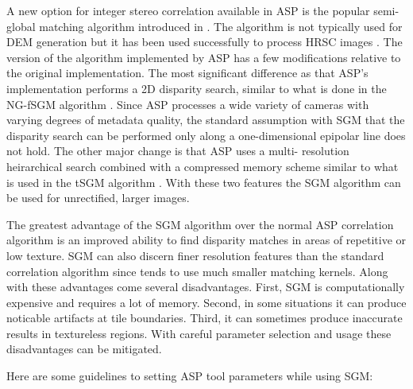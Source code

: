 A new option for integer stereo correlation available in ASP is the 
popular semi-global matching algorithm introduced in 
\citep{hirschmuller_sgm_original}.  The algorithm is not typically used for
DEM generation but it has been used successfully to process HRSC images
\citep{hirschmuller_hrsc_with_sgm}.  The version of the algorithm implemented
by ASP has a few modifications relative to the original implementation.  The
most significant difference as that ASP's implementation performs a 2D disparity
search, similar to what is done in the NG-fSGM algorithm 
\citep{xiang_2016_low_complexity_fsgm}.  Since ASP processes a wide variety of
cameras with varying degrees of metadata quality, the standard assumption 
with SGM that the disparity search can be performed only along a one-dimensional 
epipolar line does not hold.  The other major change is that ASP uses a multi-
resolution heirarchical search combined with a compressed memory scheme similar
to what is used in the tSGM algorithm \citep{rothermel2012sure_isgm}.  With
these two features the SGM algorithm can be used for unrectified, larger images.

The greatest advantage of the SGM algorithm over the normal ASP correlation algorithm
is an improved ability to find disparity matches in areas of repetitive or low texture.
SGM can also discern finer resolution features than the standard correlation algorithm
since tends to use much smaller matching kernels.  Along with these advantages come several disadvantages.
First,  SGM is computationally expensive and requires a lot of memory.  Second, in some
situations it can produce noticable artifacts at tile boundaries.  Third, it can 
sometimes produce inaccurate results in textureless regions.  With careful parameter
selection and usage these disadvantages can be mitigated.

Here are some guidelines to setting ASP tool parameters while using SGM:


